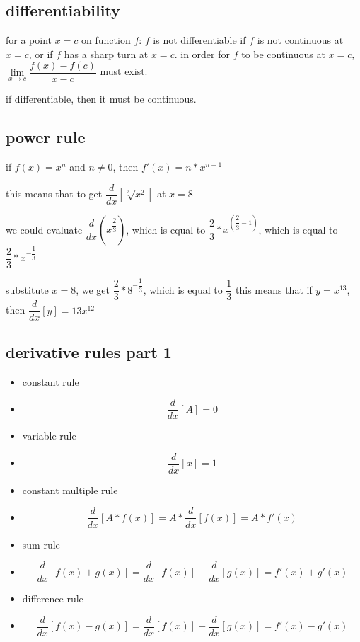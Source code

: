 \documentclass[11pt,a4paper]{article}
\begin{document}
\subsection{differentiability}
for a point $x=c$ on function $f$: $f$ is not differentiable if $f$ is not continuous at $x=c$, or if $f$ has a sharp turn at $x=c$. in order for $f$ to be continuous at $x=c$, $\lim \limits_{x \to c}\dfrac{f(x)-f(c)}{x-c}$ must exist.

if differentiable, then it must be continuous.

\subsection{power rule}

if $f(x) = x^n$ and $n\neq0$, then $f'(x)=n*x^{n-1}$

this means that to get $\dfrac{d}{dx}\left[ \sqrt[3]{x^2} \right]$ at $x=8$

we could evaluate $\dfrac{d}{dx}\left( x^{\dfrac{2}{3}} \right)$, which is equal to $\dfrac{2}{3}*x^{\left(\dfrac{2}{3}-1\right)}$, which is equal to $\dfrac{2}{3}*x^{-\dfrac{1}{3}}$

substitute $x=8$, we get $\dfrac{2}{3}*8^{-\dfrac{1}{3}}$, which is equal to $\dfrac{1}{3}$
\vspace{15pt}
this means that if $y=x^13$, then $\dfrac{d}{dx}\left[ y \right] = 13x^{12}$

\subsection{derivative rules part 1}

\begin{itemize}
\centering
\item constant rule
\item[] $$\dfrac{d}{dx}\left[A\right]=0$$

\item variable rule
\item[] $$\dfrac{d}{dx}\left[x\right] = 1$$

\item constant multiple rule
\item[] $$\dfrac{d}{dx}\left[A*f(x)\right] = A*\dfrac{d}{dx}\left[f(x)\right] = A*f'(x)$$

\item sum rule
\item[] $$\dfrac{d}{dx}\left[f(x)+g(x)\right] = \dfrac{d}{dx}\left[f(x)\right] +\dfrac{d}{dx}\left[g(x)\right] = f'(x) + g'(x)$$

\item difference rule
\item[] $$\dfrac{d}{dx}\left[f(x)-g(x)\right] = \dfrac{d}{dx}\left[f(x)\right] -\dfrac{d}{dx}\left[g(x)\right] = f'(x) - g'(x)$$
\end{itemize}
\end{document}
